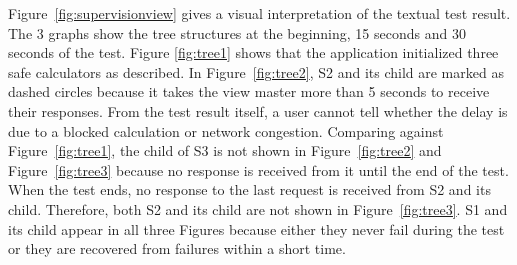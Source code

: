 Figure~\ref{fig:supervisionview} gives a visual interpretation of the textual
test result.  The 3 graphs show the
tree structures at the beginning, 15 seconds and 30 seconds of the test.  Figure 
\ref{fig:tree1} shows that the application initialized three safe calculators 
as described.  In Figure~\ref{fig:tree2}, S2 and its child are marked as dashed 
circles because it takes the view master more than 5 seconds to receive their 
responses.  From the test result itself, a user cannot tell whether the delay 
is due to a blocked calculation or network congestion.  Comparing against 
Figure~\ref{fig:tree1}, the child of S3 is not shown in Figure~\ref{fig:tree2} 
and Figure~\ref{fig:tree3} because no response is received from it until the 
end of the test.  When the test ends, no response to the last request is 
received from S2 and its child.  Therefore, both S2 and its child are not shown 
in Figure~\ref{fig:tree3}.  S1 and its child appear in all three Figures 
because either they never fail during the test or they are recovered from 
failures within a short time.


